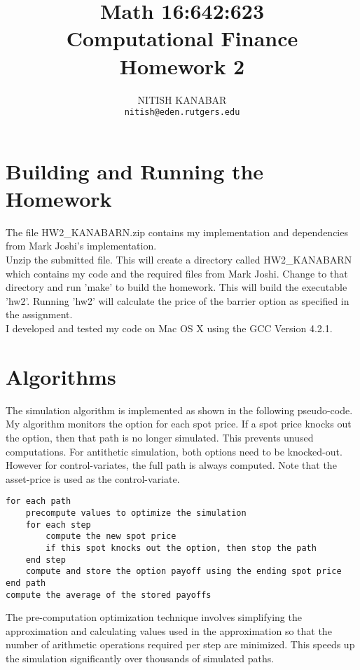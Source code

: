 \documentclass[letterpaper,twoside,11pt,fleqn]{article}
\begin{document}

\title{Math 16:642:623 \\Computational Finance \\ Homework 2}
\author{NITISH KANABAR \\ \texttt{nitish@eden.rutgers.edu}}

\maketitle

\thispagestyle{empty} 

\cleardoublepage

\pagestyle{plain} 
\setcounter{page}{1}


\section*{Building and Running the Homework}

The file HW2\_KANABARN.zip contains my implementation and dependencies from Mark Joshi's implementation. \\

Unzip the submitted file. This will create a directory called HW2\_KANABARN which contains my code and the required files from Mark Joshi.  Change to that directory and run 'make' to build the homework.  This will build the executable 'hw2'.  Running 'hw2' will calculate the price of the barrier option as specified in the assignment.  \\

I developed and tested my code on Mac OS X using the GCC Version 4.2.1.


\section*{Algorithms}
The simulation algorithm is implemented as shown in the following pseudo-code.  My algorithm monitors the option for each spot price. If a spot price knocks out the option, then that path is no longer simulated. This prevents unused computations.  For antithetic simulation, both options need to be knocked-out. However for control-variates, the full path is always computed. Note that the asset-price is used as the control-variate.
\begin{verbatim}
for each path
    precompute values to optimize the simulation
    for each step
        compute the new spot price
        if this spot knocks out the option, then stop the path
    end step
    compute and store the option payoff using the ending spot price
end path
compute the average of the stored payoffs
\end{verbatim}
The pre-computation optimization technique involves simplifying the approximation and calculating values used in the approximation so that the number of arithmetic operations required per step are minimized.  This speeds up the simulation significantly over thousands of simulated paths.
\end{document}
